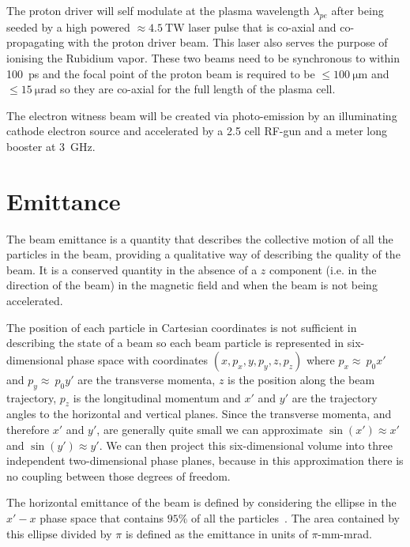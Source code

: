 The proton driver will self modulate at the plasma wavelength \(\lambda_{pe}\)
after being seeded by a high powered \(\approx \SI{4.5}{\tera\watt}\) laser
pulse that is co-axial and co-propagating with the proton driver beam. This
laser also serves the purpose of ionising the Rubidium vapor. These two beams
need to be synchronous to within \SI{100}{\pico\second} and the focal point of
the proton beam is required to be \(\le\SI{100}{\micro\meter}\) and
\(\le\SI{15}{\micro\radian}\) so they are co-axial for the full length of the
plasma cell.

The electron witness beam will be created via photo-emission by an illuminating
cathode electron source and accelerated by a 2.5 cell RF-gun and a meter long
booster at \SI{3}{\giga\hertz}.


\section{Emittance}

The beam emittance is a quantity that describes the collective motion of all
the particles in the beam, providing a qualitative way of describing the
quality of the beam. It is a conserved quantity in the absence of a \(z\)
component (i.e. in the direction of the beam) in the magnetic field and when
the beam is not being accelerated.

The position of each particle in Cartesian coordinates is not sufficient in
describing the state of a beam so each beam particle is represented in
six-dimensional phase space with coordinates \(\left(x,p_x,y,p_y,z,p_z\right)\)
where \(p_x\approx~p_0x'\) and \(p_y\approx~p_0y'\) are the transverse momenta,
\(z\) is the position along the beam trajectory, \(p_z\) is the longitudinal
momentum and \(x'\) and \(y'\) are the trajectory angles to the horizontal and
vertical planes. Since the transverse momenta, and therefore \(x'\) and \(y'\),
are generally quite small we can approximate \(\sin\left(x'\right)\approx x'\)
and \(\sin\left(y'\right)\approx y'\). We can then project this six-dimensional
volume into three independent two-dimensional phase planes, because in this
approximation there is no coupling between those degrees of freedom.

The horizontal emittance of the beam is defined by considering the ellipse in
the \(x'-x\) phase space that contains \(95\%\) of all the
particles~\cite{buon1994beam}. The area contained by this ellipse divided by
\(\pi\) is defined as the emittance in units of \(\pi\)-mm-mrad.

